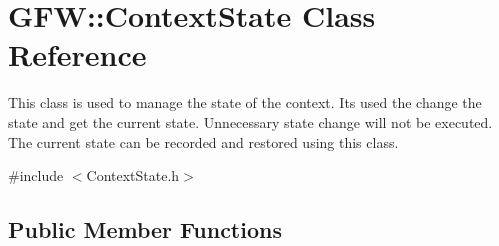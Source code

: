 \hypertarget{class_g_f_w_1_1_context_state}{}\section{G\+FW\+:\+:Context\+State Class Reference}
\label{class_g_f_w_1_1_context_state}


This class is used to manage the state of the context. It\textquotesingle{}s used the change the state and get the current state. Unnecessary state change will not be executed. The current state can be recorded and restored using this class.  




{\ttfamily \#include $<$Context\+State.\+h$>$}

\subsection*{Public Member Functions}
